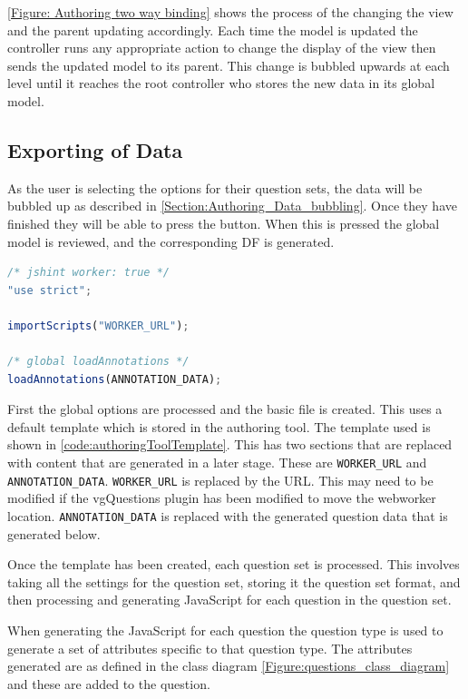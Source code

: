 \autoref{Figure: Authoring two way binding} shows the process of the changing the view and the parent updating accordingly. Each time the model is updated the controller runs any appropriate action to change the display of the view then sends the updated model to its parent. This change is bubbled upwards at each level until it reaches the root controller who stores the new data in its global model.

\subsection{Exporting of Data}
\label{Section:Authoring_export_data}

As the user is selecting the options for their question sets, the data will be bubbled up as described in \autoref{Section:Authoring_Data_bubbling}. Once they have finished they will be able to press the  button. When this is pressed the global model is reviewed, and the corresponding \gls{DF} is generated.
\begin{lstlisting}[language=javascript,caption={Base template for authoring tool \gls{DF} generation},label={code:authoringToolTemplate} ]
/* jshint worker: true */
"use strict";

importScripts("WORKER_URL");

/* global loadAnnotations */
loadAnnotations(ANNOTATION_DATA);
\end{lstlisting}

First the global options are processed and the basic file is created. This uses a default template which is stored in the authoring tool. The template used is shown in \autoref{code:authoringToolTemplate}. This has two sections that are replaced with content that are generated in a later stage. These are \lstinline|WORKER_URL| and \lstinline|ANNOTATION_DATA|. \lstinline|WORKER_URL| is replaced by the URL. This may need to be modified if the \gls{vgQuestions} plugin has been modified to move the \gls{webworker} location. \lstinline|ANNOTATION_DATA| is replaced with the generated question data that is generated below.

Once the template has been created, each question set is processed. This involves taking all the settings for the question set, storing it the question set format, and then processing and generating JavaScript for each question in the question set.

When generating the JavaScript for each question the question type is used to generate a set of attributes specific to that question type. The attributes generated are as defined in the class diagram \autoref{Figure:questions_class_diagram} and these are added to the question.

